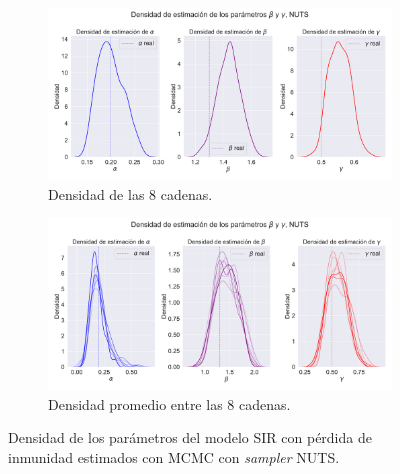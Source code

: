 \begin{figure}[h]
    \centering
    \begin{subfigure}[b]{\linewidth}
        \centering
        \includegraphics[width=0.55\linewidth]{img/content/chapter4/NUTS_sir_rec_params_density.pdf}
        \caption{Densidad de las 8 cadenas.}
    \end{subfigure}
     \begin{subfigure}[b]{\linewidth}
        \centering
        \includegraphics[width=0.55\linewidth]{img/content/chapter4/NUTS_sir_rec_params_density_mean.pdf}
        \caption{Densidad promedio entre las 8 cadenas.}
    \end{subfigure}
    \caption{Densidad de los parámetros del modelo SIR con pérdida de inmunidad estimados con MCMC con \textit{sampler} NUTS.}
\end{figure}

